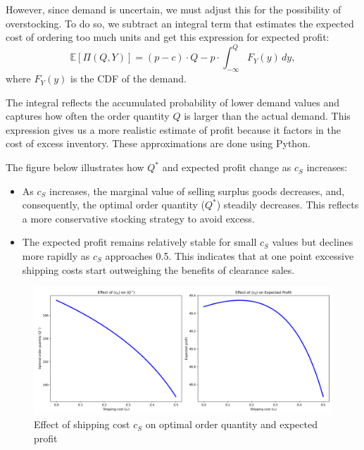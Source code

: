 However, since demand is uncertain, we must adjust this for the possibility of overstocking. To do so, we subtract an integral term that estimates the expected cost of ordering too much units and get this expression for expected profit:
\[
\mathbb{E}[\Pi(Q, Y)] = (p - c) \cdot Q - p \cdot \int_{-\infty}^{Q} F_Y(y) \, dy,
\]
where $F_Y(y)$ is the CDF of the demand.

The integral reflects the accumulated probability of lower demand values and captures how often the order quantity $Q$ is larger than the actual demand. This expression gives us a more realistic estimate of profit because it factors in the cost of excess inventory. These approximations are done using Python.

\bigskip \bigskip

The figure below illustrates how $Q^*$ and expected profit change as $c_S$ increases:

\begin{itemize}
    \item As $c_S$ increases, the marginal value of selling surplus goods decreases, and, consequently, the optimal order quantity ($Q^*$) steadily decreases. This reflects a more conservative stocking strategy to avoid excess.
    
    \item The expected profit remains relatively stable for small $c_S$ values but declines more rapidly as $c_S$ approaches 0.5. This indicates that at one point excessive shipping costs start outweighing the benefits of clearance sales.
\end{itemize}

\begin{figure}[H]
    \centering
    \includegraphics[width=1.00\textwidth]{figures/task2plot.png}
    \caption{Effect of shipping cost $c_S$ on optimal order quantity and expected profit}
\end{figure}
